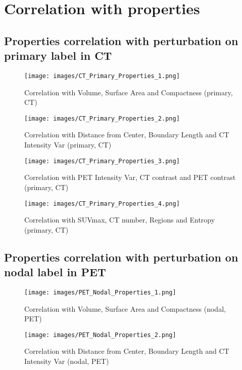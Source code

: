 
\chapter{Correlation with properties}

\label{chap:CorrProp}

\section{Properties correlation with perturbation on primary label in CT}
\begin{figure}[ht]
    \centering
    \texttt{[image: images/CT\_Primary\_Properties\_1.png]}
    \caption{Correlation with Volume, Surface Area and Compactness (primary, CT)}
\end{figure}
\begin{figure}[ht]
    \centering
    \texttt{[image: images/CT\_Primary\_Properties\_2.png]}
    \caption{Correlation with Distance from Center, Boundary Length and CT Intensity Var (primary, CT)}
\end{figure}
\begin{figure}[ht]
    \centering
    \texttt{[image: images/CT\_Primary\_Properties\_3.png]}
    \caption{Correlation with PET Intensity Var, CT contrast and PET contrast (primary, CT)}
\end{figure}
\begin{figure}[ht]
    \centering
    \texttt{[image: images/CT\_Primary\_Properties\_4.png]}
    \caption{Correlation with SUVmax, CT number, Regions and Entropy (primary, CT)}
\end{figure}

\clearpage
\section{Properties correlation with perturbation on nodal label in PET}

\begin{figure}[ht]
    \centering
    \texttt{[image: images/PET\_Nodal\_Properties\_1.png]}
    \caption{Correlation with Volume, Surface Area and Compactness (nodal, PET)}
\end{figure}

\begin{figure}[ht]
    \centering
    \texttt{[image: images/PET\_Nodal\_Properties\_2.png]}
    \caption{Correlation with Distance from Center, Boundary Length and CT Intensity Var (nodal, PET)}
\end{figure}

